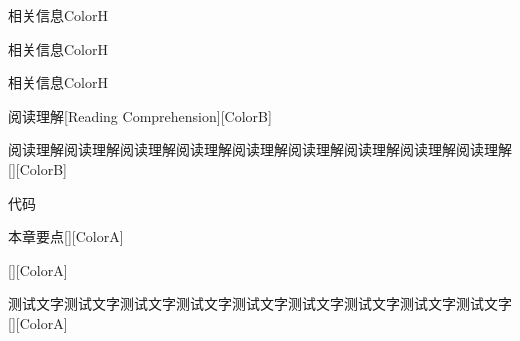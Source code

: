 \documentclass[color=green]{textbook-cn}%
\newlength{\la}\newlength{\lb}\newlength{\lc}\newlength{\ld}
\begin{document}
\begin{Project}
\begin{box7}{相关信息}{ColorH}{\faCommentDots}
	\zhlipsum[3]
\end{box7}

\begin{Paracol}
\begin{box7}{相关信息}{ColorH}{\faCommentDots}
	\lipsum[3]
\end{box7}
\switchcolumn
\begin{box7}{相关信息}{ColorH}{\faCommentDots}
	\lipsum[3][1-2]
\end{box7}

\end{Paracol}



\begin{box9}{阅读理解}[Reading Comprehension][ColorB]
\lipsum
\end{box9}


\begin{box9}{阅读理解阅读理解阅读理解阅读理解阅读理解阅读理解阅读理解阅读理解阅读理解}[][ColorB]
	\lipsum
\end{box9}




\begin{Vocabulary}
	\lipsum[2]
	\lipsum[2]
\end{Vocabulary}




\begin{PythonBox}{代码}
	
\end{PythonBox}



\begin{box0}[left=0mm]{本章要点}[][ColorA]
\lipsum[3]
\end{box0}

\begin{box0}[left=0mm]{ }[][ColorA]
	\lipsum[3]
\end{box0}

\begin{box0}[left=0mm]{测试文字测试文字测试文字测试文字测试文字测试文字测试文字测试文字测试文字}[][ColorA]
	\lipsum[3]
\end{box0}



\begin{Exercise}
\lipsum[2]
\end{Exercise}


\Example{\lipsum[2]}



\begin{Proof}
	\lipsum[2]
\end{Proof}





\makeatother

\end{Project}
\end{document}
